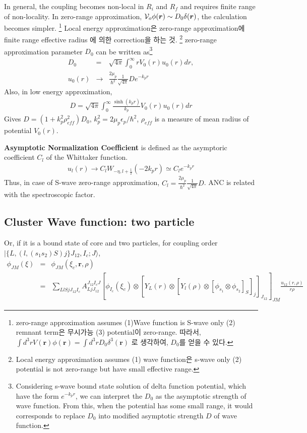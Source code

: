 \documentclass[11pt]{book}
\def\bm{\boldsymbol}
\def\vr{{\bm r}}
\def\ra{\rangle}
\newcommand{\bea}{\begin{eqnarray}}
\newcommand{\eea}{\end{eqnarray}}
\newcommand{\no}{\nonumber \\}
\begin{document}
In general, the coupling becomes non-local in $R_i$ and $R_f$
and requires finite range of non-locality. In zero-range approximation,
${\cal V}_o \phi(\vr)\sim D_0 \delta(\vr)$, the calculation becomes simpler. 
\footnote{zero-range approximation assumes
(1)Wave function is S-wave only (2) remnant term은 무시가능 (3) potential이 zero-range.
따라서, $\int d^3 r V(\vr)\phi(\vr)=\int d^3 r D_0 \delta^3(\vr)$ 로 생각하여, $D_0$를 얻을 수 있다.
}
Local energy approximation은 zero-range approximation에 
finite range effective radius 에 의한 correction을 하는 것.
\footnote{Local energy approximation assumes (1) wave function은 s-wave only 
(2) potential is not zero-range but have small effective range.
} 
zero-range approximation parameter $D_0$ can be written as\footnote{
Considering s-wave bound state solution of delta function potential,
which have the form $e^{-k_p r}$, we can interpret the $D_0$ as the 
asymptotic strength of wave function. From this, when the 
potential has some small range, it would corresponds to replace
$D_0$ into modified asymptotic strength $D$ of wave function. 
} 
\bea 
D_0&=&\sqrt{4\pi}\int_0^\infty r V_0(r) u_0(r) dr,\no 
u_0(r)&\to& \frac{2\mu_p}{\hbar^2}\frac{1}{\sqrt{4\pi}} D e^{-k_p r}
\eea 
Also, in low energy approximation, 
\bea 
D=\sqrt{4\pi}\int_0^\infty \frac{\sinh(k_p r)}{k_p} V_0(r) u_0(r) dr
\eea 
Gives $D=(1+k_p^2 \rho^2_{eff})D_0$, $k_p^2=2\mu_p\epsilon_p/\hbar^2$,
$\rho_{eff}$ is a measure of mean radius of potential $V_0(r)$. 

{\bf Asymptotic Normalization Coefficient} is defined 
as the asymptoric coefficient $C_l$ of the Whittaker function. 
\bea 
u_l(r)\to C_l W_{-\eta,l+\frac{1}{2}}(-2 k_p r)\simeq C_l e^{-k_p r}
\eea 
Thus, in case of S-wave zero-range approximation,
$C_l=\frac{2\mu_p}{\hbar^2}\frac{1}{\sqrt{4\pi}}D$.
ANC is related with the spectroscopic factor. 

\subsection{Cluster Wave function: two particle} 
Or, if it is a bound state of core and two particles,
for coupling order $|\{L,(l,(s_1 s_2)S)j \} J_{12}, I_c ; J\ra$,
\bea 
\phi_{JM}(\xi)&=&\phi_{JM}(\xi_c,\vr,\rho) \no 
   &=&\sum_{L l S j J_{12} I_c} 
   A^{J_{12}I_c  J}_{L j J_{12}}  
   [\phi_{I_c}(\xi_c)\otimes 
            [  Y_{L}(r)\otimes
            [Y_{l}(\rho)\otimes [\phi_{s_1}\otimes\phi_{s_2}]_S]_j]_{J_{12}}                ]_{JM} 
            \frac{u_{12}(r,\rho)}{r \rho}  
\eea 
\end{document}
